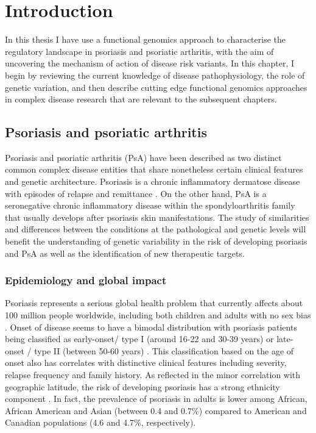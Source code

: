 \chapter{Introduction}
\label{ch:Intro}



In this thesis I have use a functional genomics approach to characterise the regulatory landscape in psoriasis and psoriatic arthritis, with the aim of uncovering the mechanism of action of disease risk variants. In this chapter, I begin by reviewing the current knowledge of disease pathophysiology, the role of genetic variation, and then describe cutting edge functional genomics approaches in complex disease research that are relevant to the subsequent chapters.

\section{Psoriasis and psoriatic arthritis}
%
Psoriasis and psoriatic arthritis (PsA) have been described as two distinct common complex disease entities that share nonetheless certain clinical features and genetic architecture. Psoriasis is a chronic inflammatory dermatose disease with episodes of relapse and remittance \parencite{Nestle2009}. On the other hand, PsA is a seronegative chronic inflammatory disease within the spondyloarthritis family that usually develops after psoriasis skin manifestations\parencite{Moll1973, Coates2016, Villanova2016}. The study of similarities and differences between the conditions at the pathological and genetic levels will benefit the understanding of genetic variability in the risk of developing psoriasis and PsA as well as the identification of new therapeutic targets.


\subsection{Epidemiology and global impact}
%
Psoriasis represents a serious global health problem that currently affects about 100 million people worldwide, including both children and adults with no sex bias \parencite{Organization2016}. Onset of disease seems to have a bimodal distribution with psoriasis patients being classified as early-onset/ type I (around 16-22 and 30-39 years) or late-onset / type II (between 50-60 years) \parencite{Henseler1985}. This classification based on the age of onset also has correlates with distinctive clinical features including severity, relapse frequency and family history. As reflected in the minor correlation with geographic latitude, the risk of developing psoriasis has a strong ethnicity component \parencite{Jacobson2011}. In fact, the prevalence of psoriasis in adults is lower among African, African American and Asian (between 0.4 and 0.7\%) compared to American and Canadian populations (4.6 and 4.7\%, respectively). 

